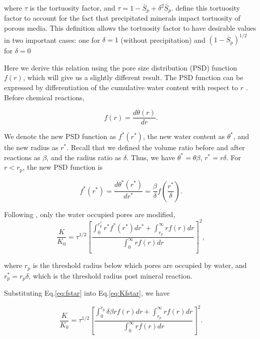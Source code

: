 \documentclass[preprint,12pt,authoryear]{elsarticle}
\begin{document}
where $\tau$ is the tortuosity factor, and $\tau=1-\bar{S}_p+\delta^2\bar{S}_p$. \cite{liu2013permeability} define this tortuosity factor to account for the fact that precipitated minerals impact tortuosity of porous media. This definition allows the tortuosity factor to have desirable values in two important cases: one for $\delta=1$ (without precipitation) and $(1-\bar{S}_p)^{1/2}$ for $\delta=0$

Here we derive this relation using the pore size distribution (PSD) function $f(r)$, which will give us a slightly different result. The PSD function can be expressed by differentiation of the cumulative water content with respect to $r$ \citep{ritter1945pressure}. Before chemical reactions,

\begin{equation}
f(r)=\dfrac{d\theta(r)}{dr}.
\end{equation}

We denote the new PSD function as $f^*(r^*)$, the new water content as $\theta^*$, and the new radius as $r^*$. Recall that we defined the volume ratio before and after reactions as $\beta$, and the radius ratio as $\delta$. Thus, we have $\theta^*=\theta\beta$, $r^*=r\delta$. For $r<r_{p}$, the new PSD function is

\begin{equation}
\label{eq:fstar}
f^*(r^*)=\dfrac{d\theta^*(r^*)}{dr^*}=\dfrac{\beta}{\delta}f(\dfrac{r^*}{\delta}).
\end{equation}

Following \cite{liu2013permeability}, only the water occupied pores are modified,
\begin{equation}
\label{eq:Kfstar}
\dfrac{K}{K_0}=\tau^{1/2}[\dfrac{\int_0^{r_p^*}r^*f^*(r^*)dr^*+\int_{r_p}^\infty rf(r)dr}{\int_0^\infty rf(r)dr}]^2,
\end{equation}


where $r_p$ is the threshold radius below which pores are occupied by water, and $r_p^*=r_p \delta$, which is the threshold radius post mineral reaction.

Substituting Eq.\ref{eq:fstar} into Eq.\ref{eq:Kfstar}, we have

\begin{equation}
\dfrac{K}{K_0}=\tau^{1/2}[\dfrac{\int_0^{r_p} \delta\beta rf(r)dr+\int_{r_p}^\infty rf(r)dr}{\int_0^\infty rf(r)dr}]^2.
\end{equation}
\end{document}
